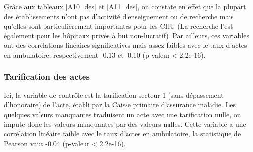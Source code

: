 \bigskip

Grâce aux tableaux \ref{A10_des} et \ref{A11_des}, on constate en effet que la plupart des établissements n'ont pas d'activité d'enseignement ou de recherche mais qu'elles sont particulièrement importantes pour les CHU (La recherche l'est également pour les hôpitaux privés à but non-lucratif). Par ailleurs, ces variables ont des corrélations linéaires significatives mais assez faibles avec le taux d'actes en ambulatoire, respectivement -0.13 et -0.10 (p-valeur < 2.2e-16).

\subsubsection*{Tarification des actes}

Ici, la variable de contrôle est la tarification secteur 1 (sans dépassement d'honoraire) de l'acte, établi par la Caisse primaire d'assurance maladie. Les quelques valeurs manquantes traduisent un acte avec une tarification nulle, on impute donc les valeurs manquantes par des valeurs nulles. Cette variable a une corrélation linéaire faible avec le taux d'actes en ambulatoire, la statistique de Pearson vaut -0.04 (p-valeur < 2.2e-16).\\